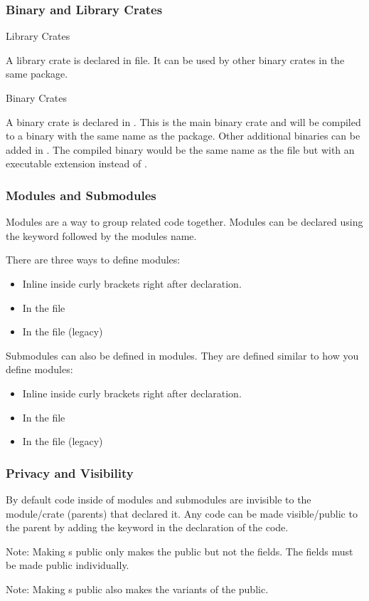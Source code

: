 \documentclass{beamer}
\begin{document}
\begin{frame}
  \frametitle{Binary and Library Crates}
  {\fontsize{15pt}{18pt}\selectfont Library Crates}

  A library crate is declared in  file. It can be used by other binary crates in the same package.

  {\fontsize{15pt}{18pt}\selectfont Binary Crates}

  A binary crate is declared in . This is the main binary crate and will be compiled to a binary with the same name as the package. Other additional binaries can be added in . The compiled binary would be the same name as the file but with an executable extension instead of .
\end{frame}

\begin{frame}
  \frametitle{Modules and Submodules}
  Modules are a way to group related code together. Modules can be declared using the  keyword followed by the modules name.

  There are three ways to define modules:
  \begin{itemize}
    \item Inline inside curly brackets right after declaration.
    \item In the file 
    \item In the file  (legacy)
  \end{itemize}

  Submodules can also be defined in modules. They are defined similar to how you define modules:
  \begin{itemize}
    \item Inline inside curly brackets right after declaration.
    \item In the file 
    \item In the file  (legacy)
  \end{itemize}
\end{frame}

\begin{frame}
  \frametitle{Privacy and Visibility}
  By default code inside of modules and submodules are invisible to the module/crate (parents) that declared it. Any code can be made visible/public to the parent by adding the  keyword in the declaration of the code.

  

  \alert{Note}: Making s public only makes the  public but not the fields. The fields must be made public individually.

  \alert{Note}: Making s public also makes the variants of the  public.
\end{frame}
\end{document}
